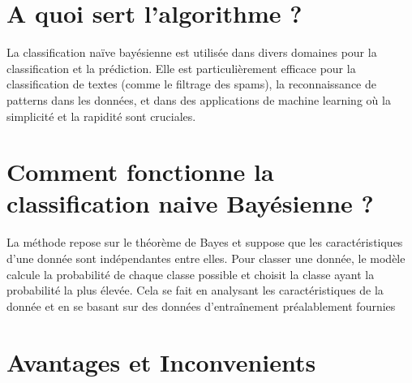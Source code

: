 \documentclass[a0,portrait]{a0poster}
\begin{document}




\color{SaddleBrown} %

\section*{A quoi sert l'algorithme ?}

La classification naïve bayésienne est utilisée dans divers domaines pour la classification et la prédiction. Elle est particulièrement efficace pour la classification de textes (comme le filtrage des spams), la reconnaissance de patterns dans les données, et dans des applications de machine learning où la simplicité et la rapidité sont cruciales.


\color{DarkSlateGray} %

\section*{Comment fonctionne la classification naive Bayésienne ?}

La méthode repose sur le théorème de Bayes et suppose que les caractéristiques d'une donnée sont indépendantes entre elles. Pour classer une donnée, le modèle calcule la probabilité de chaque classe possible et choisit la classe ayant la probabilité la plus élevée. Cela se fait en analysant les caractéristiques de la donnée et en se basant sur des données d'entraînement préalablement fournies


\section*{Avantages et Inconvenients}
\end{document}
